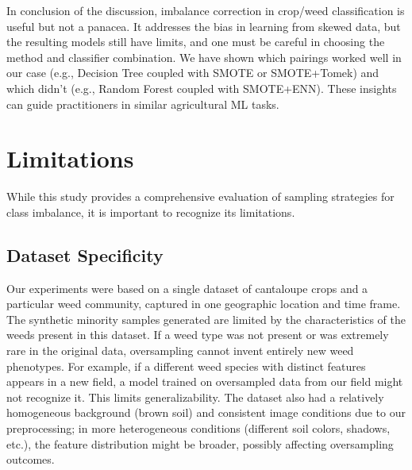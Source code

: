 \documentclass[agriengineering,article,submit,pdftex,moreauthors]{Definitions/mdpi}
\begin{document}
In conclusion of the discussion, imbalance correction in crop/weed classification is useful but not a panacea. It addresses the bias in learning from skewed data, but the resulting models still have limits, and one must be careful in choosing the method and classifier combination. We have shown which pairings worked well in our case (e.g., Decision Tree coupled with SMOTE or SMOTE+Tomek) and which didn’t (e.g., Random Forest coupled with SMOTE+ENN). These insights can guide practitioners in similar agricultural ML tasks.

\section{Limitations}
\label{section:limitations}
While this study provides a comprehensive evaluation of sampling strategies for class imbalance, it is important to recognize its limitations.

\subsection{Dataset Specificity}
Our experiments were based on a single dataset of cantaloupe crops and a particular weed community, captured in one geographic location and time frame. The synthetic minority samples generated are limited by the characteristics of the weeds present in this dataset. If a weed type was not present or was extremely rare in the original data, oversampling cannot invent entirely new weed phenotypes. For example, if a different weed species with distinct features appears in a new field, a model trained on oversampled data from our field might not recognize it. This limits generalizability. The dataset also had a relatively homogeneous background (brown soil) and consistent image conditions due to our preprocessing; in more heterogeneous conditions (different soil colors, shadows, etc.), the feature distribution might be broader, possibly affecting oversampling outcomes.
\end{document}
